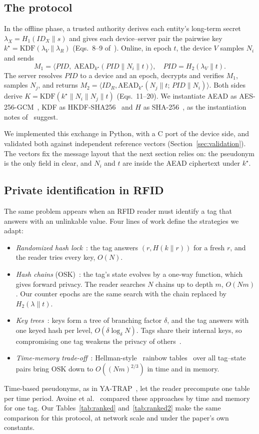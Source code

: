 \subsection{The protocol}
In the offline phase, a trusted authority derives each entity's long-term secret $\lambda_X=H_1(ID_X\|s)$ and gives
each device--server pair the pairwise key $k^\star=\mathrm{KDF}(\lambda_V\|\lambda_R)$ (Eqs.~8--9 of~\cite{base}). Online,
in epoch $t$, the device $V$ samples $N_i$ and sends
\begin{equation*}
M_1=\langle PID,\;\mathrm{AEAD}_{k^\star}(PID\|N_i\|t)\rangle,\quad PID=H_2(\lambda_V\|t).
\end{equation*}
The server resolves $PID$ to a device and an epoch, decrypts and verifies $M_1$, samples $N_j$, and returns
$M_2=\langle ID_R,\mathrm{AEAD}_{k^\star}(N_j\|t;\,PID\|N_i)\rangle$. Both sides derive
$K=\mathrm{KDF}(k^\star\|N_i\|N_j\|t)$ (Eqs.~11--20). We instantiate AEAD as AES-256-GCM~\cite{gcm}, KDF as
HKDF-SHA256~\cite{hkdf} and $H$ as SHA-256~\cite{fips180}, as the instantiation notes of~\cite{base} suggest.

We implemented this exchange in Python, with a C port of the device side, and validated both against independent
reference vectors (Section~\ref{sec:validation}). The vectors fix the message layout that the next section relies on: the
pseudonym is the only field in clear, and $N_i$ and $t$ are inside the AEAD ciphertext under $k^\star$.

\subsection{Private identification in RFID}
The same problem appears when an RFID reader must identify a tag that answers with an unlinkable value. Four lines of work
define the strategies we adapt:
\begin{itemize}
\item \emph{Randomized hash lock}~\cite{weis}: the tag answers $(r, H(k\|r))$ for a fresh $r$, and the reader tries every
key, $O(N)$.
\item \emph{Hash chains} (OSK)~\cite{ohkubo}: the tag's state evolves by a one-way function, which gives forward
privacy. The reader searches $N$ chains up to depth $m$, $O(Nm)$. Our counter epochs are the same search with the
chain replaced by $H_2(\lambda\|t)$.
\item \emph{Key trees}~\cite{molnar}: keys form a tree of branching factor $\delta$, and the tag answers with one keyed
hash per level, $O(\delta\log_\delta N)$. Tags share their internal keys, so compromising one tag weakens the privacy of
others~\cite{ado05}.
\item \emph{Time-memory trade-off}~\cite{avoine05,ado05}: Hellman-style~\cite{hellman} rainbow tables~\cite{oechslin}
over all tag--state pairs bring OSK down to $O((Nm)^{2/3})$ in time and in memory.
\end{itemize}
Time-based pseudonyms, as in YA-TRAP~\cite{tsudik}, let the reader precompute one table per time period.
Avoine et al.~\cite{ado05} compared these approaches by time and memory for one tag. Our Tables~\ref{tab:ranked} and~\ref{tab:ranked2}
make the same comparison for this protocol, at network scale and under the paper's own constants.

